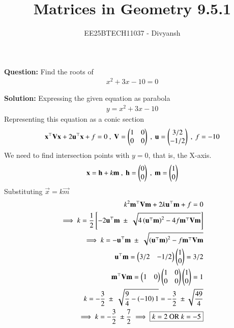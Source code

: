 \documentclass[journal,12pt,onecolumn]{IEEEtran}
\title{Matrices in Geometry 9.5.1}
\author{EE25BTECH11037 - Divyansh}
\theoremstyle{remark}
\begin{document}
\vspace{3cm}
\maketitle
{\let\newpage\relax\maketitle}
\textbf{Question: }
Find the roots of 
\begin{align}
    x^2 + 3x -10=0
\end{align}
\vspace{2mm}


\textbf{Solution:}
Expressing the given equation as parabola 
\begin{align}
    y=x^2 + 3x -10
\end{align}
Representing this equation as a conic section
\begin{align}
    \mathbf{x}^{\top}\mathbf{V}\mathbf{x} + 2\mathbf{u}^{\top}\mathbf{x} + f=0 \ , \  \mathbf{V}=\begin{pmatrix}1 & 0\\0&0\end{pmatrix} \ , \  \mathbf{u}=\begin{pmatrix}3/2 \\ -1/2\end{pmatrix} \ ,\ f=-10
\end{align}
We need to find intersection points with $y=0$, that is, the X-axis.
\begin{align}
    \vec{x}=\vec{h} + k \vec{m} \ , \ \vec{h}=\myvec{0 \\ 0} \ , \ \vec{m}=\myvec{1 \\ 0}
\end{align}
Substituting $\vec{x} = k \vec{m}$ 
\begin{align}
    k^2\vec{m}^{\top}\vec{V}\vec{m} + 2k\vec{u}^{\top}\vec{m} + f=0 \\
    \implies k= \dfrac{1}{2} \sbrak{ -2\vec{u}^{\top}\vec{m} \ \pm \ \sqrt{4\brak{\vec{u}^{\top}\vec{m}}^2 - 4 f \vec{m}^{\top}\vec{V}\vec{m}}}\\
    \implies k= -\vec{u}^{\top}\vec{m} \ \pm \ \sqrt{\brak{\vec{u}^{\top}\vec{m}}^2-f \vec{m}^{\top}\vec{V}\vec{m}}\\
    \vec{u}^{\top}\vec{m} = \myvec{3/2 & -1/2}\myvec{1 \\0} =3/2 \\
    \vec{m}^{\top}\vec{V}\vec{m}=\myvec{1 & 0}\myvec{1 & 0\\0&0}\myvec{1 \\ 0} = 1\\
    k= -\dfrac{3}{2} \ \pm \ \sqrt{ \dfrac{9}{4 } - \brak{-10} 1} = -\dfrac{3}{2} \ \pm \sqrt{\dfrac{49}{4}}\\
    \implies k= - \dfrac{3}{2} \ \pm \dfrac{7}{2}\implies \boxed{ k= 2 \text{ OR } k=-5}
\end{align}
\end{document}
